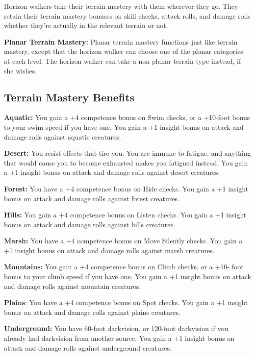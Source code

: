 \documentclass{article}
\begin{document}
Horizon walkers take their terrain mastery with them wherever they go. They retain 
their terrain mastery bonuses on skill checks, attack rolls, and damage rolls whether 
they're actually in the relevant terrain or not.

\textbf{Planar Terrain Mastery:} Planar terrain mastery functions just like terrain 
mastery, except that the horizon walker can choose one of the planar categories 
at each level. The horizon walker can take a non-planar terrain type instead, if 
she wishes.

\vspace{12pt}
\subsection*{\textbf{Terrain Mastery Benefits}}

\textbf{Aquatic:} You gain a +4 competence bonus on Swim checks, or a +10-foot 
bonus to your swim speed if you have one. You gain a +1 insight bonus on attack 
and damage rolls against aquatic creatures.

\textbf{Desert: }You resist effects that tire you. You are immune to fatigue, and 
anything that would cause you to become exhausted makes you fatigued instead. You 
gain a +1 insight bonus on attack and damage rolls against desert creatures.

\textbf{Forest:} You have a +4 competence bonus on Hide checks. You gain a +1 insight 
bonus on attack and damage rolls against forest creatures.

\textbf{Hills:} You gain a +4 competence bonus on Listen checks. You gain a +1 
insight bonus on attack and damage rolls against hills creatures.

\textbf{Marsh:} You have a +4 competence bonus on Move Silently checks. You gain 
a +1 insight bonus on attack and damage rolls against marsh creatures.

\textbf{Mountains:} You gain a +4 competence bonus on Climb checks, or a +10- foot 
bonus to your climb speed if you have one. You gain a +1 insight bonus on attack 
and damage rolls against mountain creatures.

\textbf{Plains}: You have a +4 competence bonus on Spot checks. You gain a +1 insight 
bonus on attack and damage rolls against plains creatures.

\textbf{Underground: }You have 60-foot darkvision, or 120-foot darkvision if you 
already had darkvision from another source. You gain a +1 insight bonus on attack 
and damage rolls against underground creatures.
\end{document}
